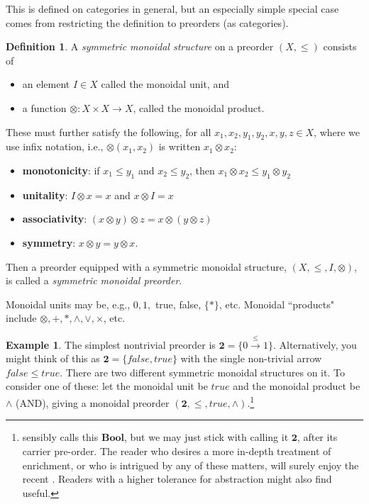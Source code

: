 \documentclass[11pt]{book}
\theoremstyle{definition}
\newtheorem{example}{Example}[section]
\theoremstyle{definition}
\newtheorem{definition}{Definition}[section]
\theoremstyle{definition}
\theoremstyle{theorem}
\theoremstyle{definition}
\begin{document}
This is defined on categories in general, but an especially simple special case comes from restricting the definition to preorders (as categories). 
\begin{definition}
	A \textit{symmetric monoidal structure} on a preorder $(X, \leq)$ consists of
	\begin{itemize}
		\item an element $I \in X$ called the monoidal unit, and 
		\item a function $\otimes: X \times X \rightarrow X$, called the monoidal product.
	\end{itemize}
	These must further satisfy the following, for all $x_1,x_2, y_1, y_2, x, y, z \in X$, where we use infix notation, i.e., $\otimes(x_1,x_2)$ is written $x_1 \otimes x_2$: 
	\begin{itemize}
		\item \textbf{monotonicity}: if $x_1 \leq y_1$ and $x_2 \leq y_2$, then $x_1 \otimes x_2 \leq y_1 \otimes y_2$
		\item \textbf{unitality}: $I \otimes x = x$ and $x \otimes I = x$
		\item \textbf{associativity}: $(x \otimes y) \otimes z = x \otimes (y \otimes z)$
		\item \textbf{symmetry}: $x \otimes y = y \otimes x$. 
	\end{itemize}
	Then a preorder equipped with a symmetric monoidal structure, $(X, \leq, I, \otimes)$, is called a \textit{symmetric monoidal preorder}.
\end{definition} \noindent  
Monoidal units may be, e.g., $0, 1,$ true, false, $\{*\}$, etc. Monoidal ``products" include $\otimes, +, *, \wedge, \vee, \times$, etc.
\begin{example}
	The simplest nontrivial preorder is $\textbf{2} = \{0 \xrightarrow{\leq} 1\}$. Alternatively, you might think of this as $\textbf{2} = \{false, true\}$ with the single non-trivial arrow $false \leq true$. There are two different symmetric monoidal structures on it. To consider one of these: let the monoidal unit be $true$ and the monoidal product be $\wedge$ (AND), giving a monoidal preorder $(\textbf{2}, \leq, true, \wedge)$.\footnote{\cite{fong_seven_2018} sensibly calls this $\textbf{Bool}$, but we may just stick with calling it $\textbf{2}$, after its carrier pre-order. The reader who desires a more in-depth treatment of enrichment, or who is intrigued by any of these matters, will surely enjoy the recent \cite{fong_seven_2018}. Readers with a higher tolerance for abstraction might also find \cite{kelly_basic_2005} useful.} 
\end{example}
\end{document}
